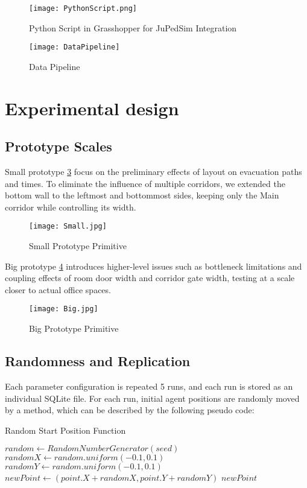 \begin{figure}[h]
    \centering
    \texttt{[image: PythonScript.png]}
    \caption{Python Script in Grasshopper for JuPedSim Integration}
    \label{fig:pythonscript}
\end{figure}

\begin{figure}[h]
    \centering
    \texttt{[image: DataPipeline]}
    \caption{Data Pipeline}
    \label{fig:pipeline}
\end{figure}

\section{Experimental design}

\subsection{Prototype Scales}
Small prototype \ref{fig:small} focus on the preliminary effects of layout on evacuation paths and times. To eliminate the influence of multiple corridors, we extended the bottom wall to the leftmost and bottommost sides, keeping only the Main corridor while controlling its width.
\begin{figure}[h]
    \centering
    \texttt{[image: Small.jpg]}
    \caption{Small Prototype Primitive}
    \label{fig:small}
\end{figure}

Big prototype \ref{fig:big} introduces higher-level issues such as bottleneck limitations and coupling effects of room door width and corridor gate width, testing at a scale closer to actual office spaces.
\begin{figure}[h]
    \centering
    \texttt{[image: Big.jpg]}
    \caption{Big Prototype Primitive}
    \label{fig:big}
\end{figure}

\subsection{Randomness and Replication}
Each parameter configuration is repeated 5 runs, and each run is stored as an individual SQLite file. For each run, initial agent positions are randomly moved by a method, which can be described by the following pseudo code:
\begin{listing}[H]
    \caption{Random Start Position Function}
    \label{Algo:randompoint}
    \begin{algorithmic}[1]
        \State $random \gets RandomNumberGenerator(seed)$
        \State $randomX \gets random.uniform(-0.1, 0.1)$
        \State $randomY \gets random.uniform(-0.1, 0.1)$
        \State $newPoint \gets (point.X + randomX, point.Y + randomY)$
        \State \Return $newPoint$
        \EndFunction
    \end{algorithmic}
\end{listing}

